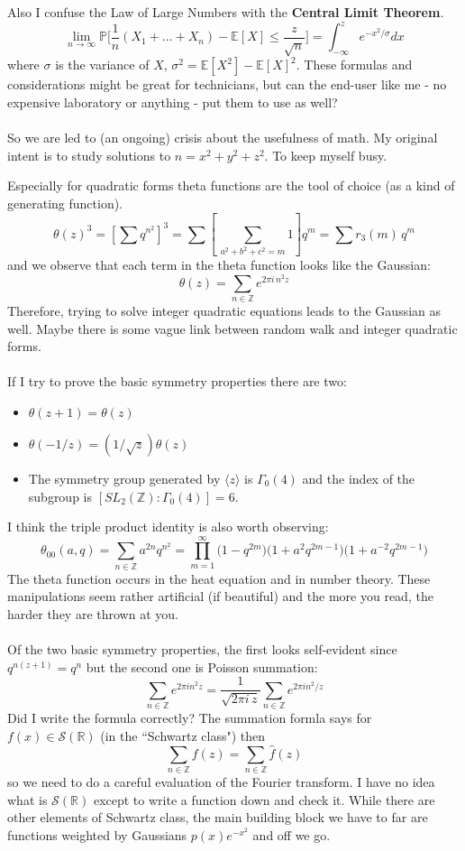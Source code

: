 \documentclass[12pt]{article}
\begin{document}
Also I confuse the Law of Large Numbers with the \textbf{Central Limit Theorem}.
$$ \lim_{n \to \infty} \mathbb{P} \Big[  \frac{1}{n}(X_1 + \dots + X_n) - \mathbb{E}[X]  \leq \frac{z}{\sqrt{n}} \Big] = \int_{-\infty}^z e^{-x^2/\sigma} dx $$
where $\sigma$ is the variance of $X$, $\sigma^2 = \mathbb{E}[X^2] - \mathbb{E}[X]^2$. These formulas and considerations might be great for technicians, but can the end-user like me - no expensive laboratory or anything - put them to use as well? \\ \\
So we are led to (an ongoing) crisis about the usefulness of math.  My original intent is to study solutions to $n = x^2 + y^2 + z^2$.  To keep myself busy.

\newpage

\noindent Especially for quadratic forms theta functions are the tool of choice (as a kind of generating function).
$$ \theta(z)^3 = \left[ \sum q^{n^2} \right]^3 = \sum \left[\, \sum_{a^2 + b^2 + c^2 = m} 1 \right] q^m 
= \sum r_3(m) \, q^m $$
and we observe that each term in the theta function looks like the Gaussian:
$$ \theta(z) = \sum_{n \in \mathbb{Z}} e^{2\pi i \, n^2 z} $$
Therefore, trying to solve integer quadratic equations leads to the Gaussian as well.  Maybe there is some vague link between random walk and integer quadratic forms.  \\ \\
If I try to prove the basic symmetry properties there are two:
\begin{itemize}
\item $\theta(z+1) = \theta(z)$
\item $\theta(-1/z) =  (1/\sqrt{z}) \theta(z)$
\item The symmetry group generated by $\langle z  \rangle $ is $\Gamma_0(4)$ and the index of the subgroup is $[SL_2(\mathbb{Z}):\Gamma_0(4) ] = 6$.
\end{itemize}
I think the triple product identity is also worth observing:
$$ \theta_{00}(a, q) = \sum_{n \in \mathbb{Z}} a^{2n} q^{n^2} = 
\prod_{m=1}^\infty \big( 1 - q^{2m} \big) \big( 1 + a^2 q^{2m-1} \big) \big( 1 + a^{-2} q^{2m-1} \big)$$
The theta function occurs in the heat equation and in number theory.  These manipulations seem rather artificial (if beautiful) and the more you read, the harder they are thrown at you.  \\ \\
Of the two basic symmetry properties, the first looks self-evident since $q^{n(z+1)} = q^{n}$ but the second one is Poisson summation:
$$ \sum_{n \in \mathbb{Z}} e^{2\pi i n^2 z} = \frac{1}{\sqrt{2\pi i \, z}}\sum_{n \in \mathbb{Z}} e^{2\pi i n^2 /z} $$
Did I write the formula correctly?  The summation formla says for $f(x) \in \mathcal{S}(\mathbb{R})$ (in the ``Schwartz class") then
$$ \sum_{n \in \mathbb{Z}} f(z) = \sum_{n \in \mathbb{Z}} \widehat{f}(z) $$
so we need to do a careful evaluation of the Fourier transform. I have no idea what is $\mathcal{S}(\mathbb{R})$ except to write a function down and check it.  While there are other elements of Schwartz class, the main building block we have to far are functions weighted by Gaussians $p(x) e^{-x^2}$ and off we go.
\vfill
\end{document}
